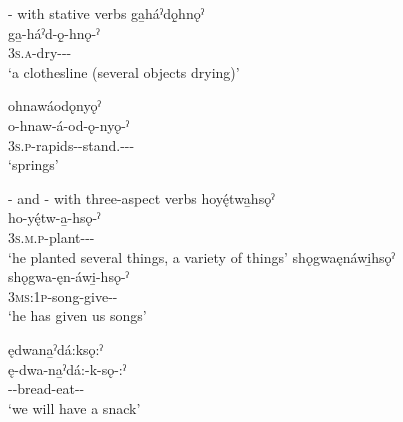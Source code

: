 \ea\label{ex:distrex3}  {\distributive}-{\stative} with stative verbs
\ea ga̱háˀdǫ̱hnǫˀ\\
\gll ga̱-háˀd-ǫ̱-hnǫ-ˀ\\
 \textsc{3s.a}-dry-{\stative}-{\distributive}-{\stative}\\
\glt `a clothesline (several objects drying)'


\ex ohnawáodǫnyǫˀ\\
\gll o-hnaw-á-od-ǫ-nyǫ-ˀ\\
 \textsc{3s.p}-rapids-{\joinerA}-stand.{\stative}-{\distributive}-{\distributive}-{\stative}\\
\glt `springs'

\z
\z


\ea\label{ex:distrex4}  {\distributive}-{\stative} and  {\distributive}-{\punctual} with three-aspect verbs
\ea hoyę́twa̱hsǫˀ\\
\gll ho-yę́tw-a̱-hsǫ-ˀ\\
 \textsc{3s.m.p}-plant-{\joinerA}-{\distributive}-{\stative}\\
\glt `he planted several things, a variety of things'
\ex shǫgwaęnáwi̱hsǫˀ\\
\gll shǫgwa-ęn-áwi̱-hsǫ-ˀ\\
 \textsc{3ms:1p}-song-give-{\distributive}-{\stative}\\
\glt `he has given us songs'

\ex ędwana̱ˀdá:ksǫ:ˀ\\
\gll ę-dwa-na̱ˀdá:-k-sǫ-:ˀ\\
 \fut--bread-eat-{\distributive}-{\punctual}\\
\glt `we will have a snack'
\z
\z

